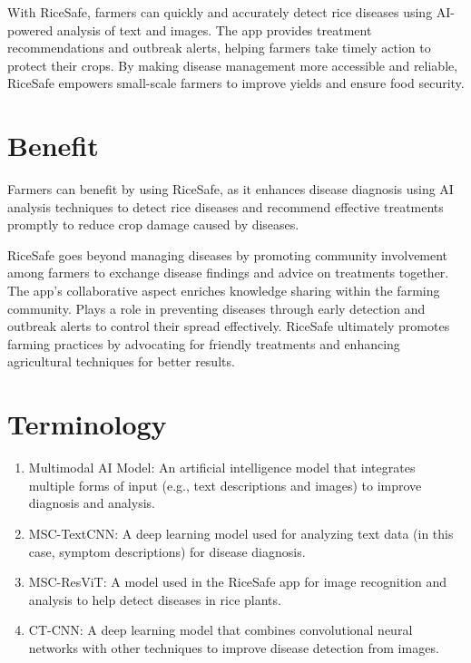 With RiceSafe, farmers can quickly and accurately detect rice diseases using AI-powered analysis of text and images. The app provides treatment recommendations and outbreak alerts, helping farmers take timely action to protect their crops. By making disease management more accessible and reliable, RiceSafe empowers small-scale farmers to improve yields and ensure food security.


\section{Benefit}
\label{section:benefit}

Farmers can benefit by using RiceSafe, as it enhances disease diagnosis using AI analysis techniques to detect rice diseases and recommend effective treatments promptly to reduce crop damage caused by diseases.

RiceSafe goes beyond managing diseases by promoting community involvement among farmers to exchange disease findings and advice on treatments together. The app's collaborative aspect enriches knowledge sharing within the farming community. Plays a role in preventing diseases through early detection and outbreak alerts to control their spread effectively. RiceSafe ultimately promotes farming practices by advocating for friendly treatments and enhancing agricultural techniques for better results.


\section{Terminology}
\label{section:terminology}

\begin{enumerate}
    \item Multimodal AI Model: An artificial intelligence model that integrates multiple forms of input (e.g., text descriptions and images) to improve diagnosis and analysis.
    \item MSC-TextCNN: A deep learning model used for analyzing text data (in this case, symptom descriptions) for disease diagnosis.
    \item MSC-ResViT: A model used in the RiceSafe app for image recognition and analysis to help detect diseases in rice plants.
    \item CT-CNN: A deep learning model that combines convolutional neural networks with other techniques to improve disease detection from images.
\end{enumerate}